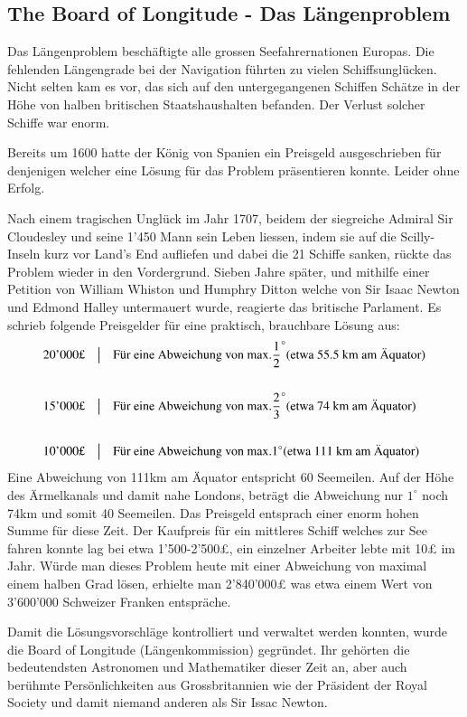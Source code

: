 \begin{refsection}
\section{The Board of Longitude - Das Längenproblem}
Das Längenproblem beschäftigte alle grossen Seefahrernationen Europas. Die fehlenden Längengrade bei der Navigation führten zu vielen Schiffsunglücken. Nicht selten kam es vor, das sich auf den untergegangenen Schiffen Schätze in der Höhe von halben britischen Staatshaushalten befanden. Der Verlust solcher Schiffe war enorm.

Bereits um 1600 hatte der König von Spanien ein Preisgeld ausgeschrieben für denjenigen welcher eine Lösung für das Problem präsentieren konnte. Leider ohne Erfolg.

Nach einem tragischen Unglück im Jahr 1707, beidem der siegreiche Admiral Sir Cloudesley und seine 1’450 Mann sein Leben liessen, indem sie auf die Scilly-Inseln kurz vor Land’s End aufliefen und dabei die 21 Schiffe sanken, rückte das Problem wieder in den Vordergrund.
Sieben Jahre später, und mithilfe einer Petition von William Whiston und Humphry Ditton welche von Sir Isaac Newton und Edmond Halley untermauert wurde, reagierte das britische Parlament.
Es schrieb folgende Preisgelder für eine praktisch, brauchbare Lösung aus:
\[
\begin{aligned}
&\text{20’000£}
&
&\text{\big \vert}
&
&\text{Für eine Abweichung von max.} \frac{1}{2}^{\circ} \text{(etwa 55.5 km am Äquator)}
\\
\\
&\text{15’000£}
&
&\text{\big \vert}
&
&\text{Für eine Abweichung von max.} \frac{2}{3}^{\circ} \text{(etwa 74 km am Äquator)}
\\
\\
&\text{10’000£}
&
&\text{\big \vert}
&
&\text{Für eine Abweichung von max.} 1 ^{\circ} \text{(etwa 111 km am Äquator)}
\end{aligned}
\]
Eine Abweichung von 111km am Äquator entspricht 60 Seemeilen.
Auf der Höhe des Ärmelkanals und damit nahe Londons, beträgt die Abweichung nur $1 ^{\circ}$ noch 74km und somit 40 Seemeilen.
Das Preisgeld entsprach einer enorm hohen Summe für diese Zeit. Der Kaufpreis für ein mittleres Schiff welches zur See fahren konnte lag bei etwa 1’500-2’500£, ein einzelner Arbeiter lebte mit 10£ im Jahr.
Würde man dieses Problem heute mit einer Abweichung von maximal einem halben Grad lösen, erhielte man 2’840’000£ was etwa einem Wert von 3’600’000 Schweizer Franken entspräche. 

Damit die Lösungsvorschläge kontrolliert und verwaltet werden konnten, wurde die Board of Longitude (Längenkommission) gegründet. Ihr gehörten die bedeutendsten Astronomen und Mathematiker dieser Zeit an, aber auch berühmte Persönlichkeiten aus Grossbritannien wie der Präsident der Royal Society und damit niemand anderen als Sir Issac Newton.



\end{refsection}
